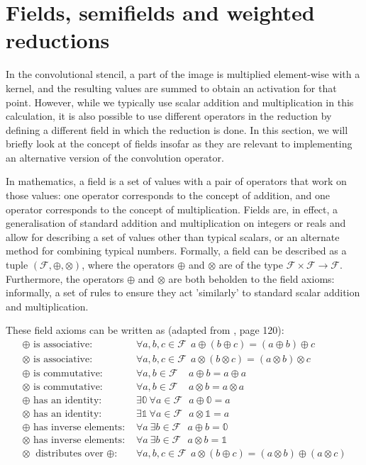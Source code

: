 \documentclass[a4paper, 12pt]{report}
\begin{document}
\section{Fields, semifields and weighted reductions}
In the convolutional stencil, a part of the image is multiplied element-wise with a kernel, and the resulting values are summed to obtain an activation for that point. However, while we typically use scalar addition and multiplication in this calculation, it is also possible to use different operators in the reduction by defining a different field in which the reduction is done. In this section, we will briefly look at the concept of fields insofar as they are relevant to implementing an alternative version of the convolution operator.

In mathematics, a field is a set of values with a pair of operators that work on those values: one operator corresponds to the concept of addition, and one operator corresponds to the concept of multiplication. Fields are, in effect, a generalisation of standard addition and multiplication on integers or reals and allow for describing a set of values other than typical scalars, or an alternate method for combining typical numbers. Formally, a field can be described as a tuple $(\mathcal{F}, \oplus, \otimes)$, where the operators $\oplus$ and $\otimes$ are of the type $\mathcal{F}\times\mathcal{F}\rightarrow\mathcal{F}$. Furthermore, the operators $\oplus$ and $\otimes$ are both beholden to the field axioms: informally, a set of rules to ensure they act 'similarly' to standard scalar addition and multiplication. 

These field axioms can be written as (adapted from \cite{beachy2006abstract}, page 120):
\begin{align}
\textrm{$\oplus$ is associative: }&\forall a,b,c\in \mathcal{F}~~  a \oplus (b \oplus c) = (a\oplus b) \oplus c \\ 
\textrm{$\otimes$ is associative: }&\forall a,b,c\in \mathcal{F}~~  a \otimes (b \otimes c) = (a\otimes b) \otimes c \\ 
\textrm{$\oplus$ is commutative: }&\forall a,b\in \mathcal{F}~~~~~ a\oplus b = a  \oplus a \\
\textrm{$\otimes$ is commutative: }&\forall a,b\in \mathcal{F}~~~~~ a\otimes b = a  \otimes a \\
\oplus\textrm{ has an identity: }& \exists \mathbb{0}~\forall a\in \mathcal{F}~~~ a\oplus \mathbb{0} = a \\ 
\otimes\textrm{ has an identity: }& \exists \mathbb{1}~\forall a\in \mathcal{F}~~~ a\otimes \mathbb{1} = a \\ 
\oplus\textrm{ has inverse elements: }& \forall a~\exists b\in \mathcal{F}~~~ a\oplus b = \mathbb{0} \label{eq:additive-inverse}  \\ 
\otimes\textrm{ has inverse elements: }& \forall a~\exists b\in \mathcal{F}~~~ a\otimes b = \mathbb{1}  \\ 
\otimes \textrm{ distributes over $\oplus$: }&\forall a,b,c\in \mathcal{F}~~ a\otimes (b \oplus c) = (a\otimes b)\oplus(a\otimes c)
\end{align}
\end{document}
